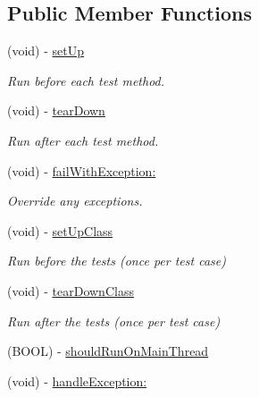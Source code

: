 \subsection*{\-Public \-Member \-Functions}
\begin{DoxyCompactItemize}
\item 
\hypertarget{interface_g_h_test_case_a7982fb6211eca346bd2477ae15d2b6d8}{
(void) -\/ \hyperlink{interface_g_h_test_case_a7982fb6211eca346bd2477ae15d2b6d8}{set\-Up}}
\label{interface_g_h_test_case_a7982fb6211eca346bd2477ae15d2b6d8}

\begin{DoxyCompactList}\small\item\em \-Run before each test method. \end{DoxyCompactList}\item 
\hypertarget{interface_g_h_test_case_ad800bebf23948e860bc4e3699708dd30}{
(void) -\/ \hyperlink{interface_g_h_test_case_ad800bebf23948e860bc4e3699708dd30}{tear\-Down}}
\label{interface_g_h_test_case_ad800bebf23948e860bc4e3699708dd30}

\begin{DoxyCompactList}\small\item\em \-Run after each test method. \end{DoxyCompactList}\item 
(void) -\/ \hyperlink{interface_g_h_test_case_aebee380283366e513402d9534e74d044}{fail\-With\-Exception\-:}
\begin{DoxyCompactList}\small\item\em \-Override any exceptions. \end{DoxyCompactList}\item 
\hypertarget{interface_g_h_test_case_ab441989e24b9942b73ed790281c1d967}{
(void) -\/ \hyperlink{interface_g_h_test_case_ab441989e24b9942b73ed790281c1d967}{set\-Up\-Class}}
\label{interface_g_h_test_case_ab441989e24b9942b73ed790281c1d967}

\begin{DoxyCompactList}\small\item\em \-Run before the tests (once per test case) \end{DoxyCompactList}\item 
\hypertarget{interface_g_h_test_case_aa34a28629d36d3ce176b12f4a106dbbd}{
(void) -\/ \hyperlink{interface_g_h_test_case_aa34a28629d36d3ce176b12f4a106dbbd}{tear\-Down\-Class}}
\label{interface_g_h_test_case_aa34a28629d36d3ce176b12f4a106dbbd}

\begin{DoxyCompactList}\small\item\em \-Run after the tests (once per test case) \end{DoxyCompactList}\item 
(\-B\-O\-O\-L) -\/ \hyperlink{interface_g_h_test_case_a08b9bcb2d874b7785918457257446066}{should\-Run\-On\-Main\-Thread}
\item 
\hypertarget{interface_g_h_test_case_a2d3628a89e080f97c76e2d4cb08acce0}{
(void) -\/ \hyperlink{interface_g_h_test_case_a2d3628a89e080f97c76e2d4cb08acce0}{handle\-Exception\-:}}
\label{interface_g_h_test_case_a2d3628a89e080f97c76e2d4cb08acce0}


\end{DoxyCompactItemize}
